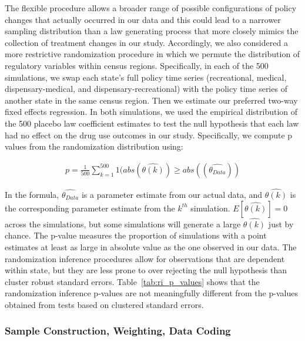 \documentclass[12pt]{article}%
\begin{document}
The flexible procedure allows a broader range of possible configurations of policy changes that actually occurred in our data and this could lead to a narrower sampling distribution than a law generating process that more closely mimics the collection of treatment changes in our study. Accordingly, we also considered a more restrictive randomization procedure in which we permute the distribution of regulatory variables within census regions. Specifically, in each of the 500 simulations, we swap each state’s full policy time series (recreational, medical,  dispensary-medical, and dispensary-recreational) with the policy time series of another state in the same census region. Then we estimate our preferred two-way fixed effects regression. 
In both simulations, we used the empirical distribution of the 500 placebo law coefficient estimates to test the null hypothesis that each law had no effect on the drug use outcomes in our study. Specifically, we compute p values from the randomization distribution using:

\begin{align*}
p= \frac{1}{500} \sum_{k=1}^{500} 1(abs(\widehat{\theta(k)}) \geq abs((\widehat{\theta_{Data}}))
\end{align*}

In the formula, $\widehat{\theta_{Data}}$ is a parameter estimate from our actual data, and $\widehat{\theta(k)}$  is the corresponding parameter estimate from the $k^{th}$ simulation. $E[\widehat{\theta(k)}]=0$ across the simulations, but some simulations will generate a large $\widehat{\theta(k)}$ just by chance. The p-value measures the proportion of simulations with a point estimates at least as large in absolute value as the one observed in our data. The randomization inference procedures allow for observations that are dependent within state, but they are less prone to over rejecting the null hypothesis than cluster robust standard errors. Table~\ref{tab:ri_p_values} shows that the randomization inference p-values are not meaningfully different from the p-values obtained from tests based on clustered standard errors.

\subsubsection{Sample Construction, Weighting, Data Coding}
\end{document}
